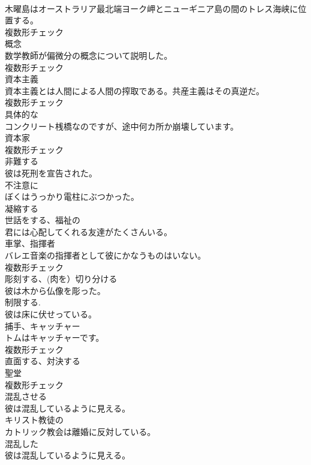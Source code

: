 \documentclass[8pt]{extreport}
\begin{document}
\begin{CJK}{UTF8}{min}
\\	木曜島はオーストラリア最北端ヨーク岬とニューギニア島の間のトレス海峡に位置する。	
\\	複数形チェック
\\	[名詞]	概念	
\\	数学教師が偏微分の概念について説明した。	
\\	複数形チェック
\\	[名詞]	資本主義	
\\	資本主義とは人間による人間の搾取である。共産主義はその真逆だ。	
\\	複数形チェック
\\	[形容詞]	具体的な	
\\	コンクリート桟橋なのですが、途中何カ所か崩壊しています。	
\\	[名詞]	資本家	
\\	複数形チェック
\\	[動詞]	非難する	
\\	彼は死刑を宣告された。	
\\	[副詞]	不注意に	
\\	ぼくはうっかり電柱にぶつかった。	
\\	[動詞]	凝縮する	
\\	[形容詞]	世話をする、福祉の	
\\	君には心配してくれる友達がたくさんいる。	
\\	[名詞]	車掌、指揮者	
\\	バレエ音楽の指揮者として彼にかなうものはいない。	
\\	複数形チェック
\\	[動詞]	彫刻する、(肉を）切り分ける	
\\	彼は木から仏像を彫った。	
\\	[動詞]	制限する.	
\\	彼は床に伏せっている。	
\\	[名詞]	捕手、キャッチャー	
\\	トムはキャッチャーです。	
\\	複数形チェック
\\	[動詞]	直面する、対決する	
\\	[名詞]	聖堂	
\\	複数形チェック
\\	[動詞]	混乱させる	
\\	彼は混乱しているように見える。	
\\	[形容詞]	キリスト教徒の	
\\	カトリック教会は離婚に反対している。	
\\	[形容詞]	混乱した	
\\	彼は混乱しているように見える。	

\end{CJK}
\end{document}
